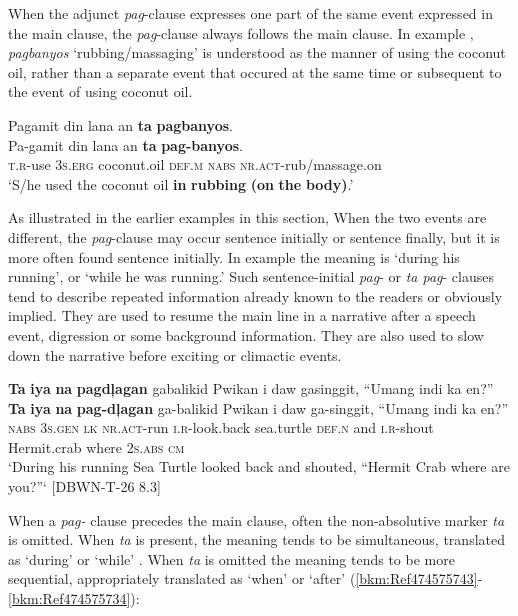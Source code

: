 When the adjunct \textit{pag}{}-clause expresses one part of the same event expressed in the main clause, the \textit{pag}{}-clause always follows the main clause. In example , \textit{pagbanyos} `rubbing/massaging' is understood as the manner of using the coconut oil, rather than a separate event that occured at the same time or subsequent to the event of using coconut oil.

\ea
\label{bkm:Ref115074170}
Pagamit  din  lana  an  \textbf{ta}  \textbf{pagbanyos}. \smallskip\\
\gll Pa-gamit  din  lana  an  \textbf{ta}  \textbf{pag-banyos}. \\
\textsc{t.r}-use  3\textsc{s.erg}  coconut.oil  \textsc{def.m}  \textsc{nabs}  \textsc{nr.act}-rub/massage.on \\
\glt ‘S/he used the coconut oil \textbf{in} \textbf{rubbing} \textbf{(on} \textbf{the} \textbf{body)}.’
\z


As illustrated in the earlier examples in this section, When the two events are different, the \textit{pag}{}-clause may occur sentence initially or sentence finally, but it is more often found sentence initially. In example  the meaning is ‘during his running’, or ‘while he was running.’ Such sentence-initial \textit{pag}{}- or \textit{ta pag}{}- clauses tend to describe repeated information already known to the readers or obviously implied. They are used to resume the main line in a narrative after a speech event, digression or some background information. They are also used to slow down the narrative before exciting or climactic events.

\ea
\label{bkm:Ref474575856}
\textbf{Ta}  \textbf{iya}  \textbf{na}  \textbf{pagdļagan}  gabalikid  Pwikan  i  daw gasinggit,  “Umang  indi  ka  en?” \smallskip\\
\gll \textbf{Ta}  \textbf{iya}  \textbf{na}  \textbf{pag-dļagan}  ga-balikid  Pwikan  i  daw ga-singgit,  “Umang  indi  ka  en?” \\
\textsc{nabs}  3\textsc{s.gen}  \textsc{lk}  \textsc{nr.act}-run  \textsc{i.r}-look.back  sea.turtle  \textsc{def.n}  and
\textsc{i.r}-shout  Hermit.crab  where  2\textsc{s.abs}  \textsc{cm} \\
\glt `During his running Sea Turtle looked back and shouted, “Hermit Crab where are you?”‘ [DBWN-T-26 8.3]
\z

When a \textit{pag-} clause precedes the main clause, often the non-absolutive marker \textit{ta} is omitted. When \textit{ta} is present, the meaning tends to be simultaneous, translated as ‘during’ or ‘while’ . When \textit{ta} is omitted the meaning tends to be more sequential, appropriately translated as ‘when’ or ‘after’ (\ref{bkm:Ref474575743}-\ref{bkm:Ref474575734}):

